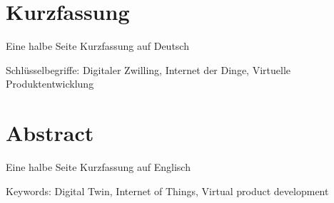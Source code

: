 \documentclass[
	thesis={type=msc}, %
	class=report,%
	ruledheaders=section,%
	accentcolor=1b, %
	marginpar=false,%
	parskip=half-,%
	fontsize=11pt,%
	IMRAD=false, %
]{tudapub}
\begin{document}
	


\cleardoublepage %

\section*{Kurzfassung}
Eine halbe Seite Kurzfassung auf Deutsch

Schlüsselbegriffe: Digitaler Zwilling, Internet der Dinge, Virtuelle Produktentwicklung

\section*{Abstract}
Eine halbe Seite Kurzfassung auf Englisch

Keywords: Digital Twin, Internet of Things, Virtual product development

\cleardoublepage %

\tableofcontents %
\cleardoublepage
\listoffigures %
\ifdocenglish
    \cleardoublepage
    \listoftables %
\else
    \cleardoublepage
    \listoftables %
\fi
\cleardoublepage

\mbox{}

\end{document}
